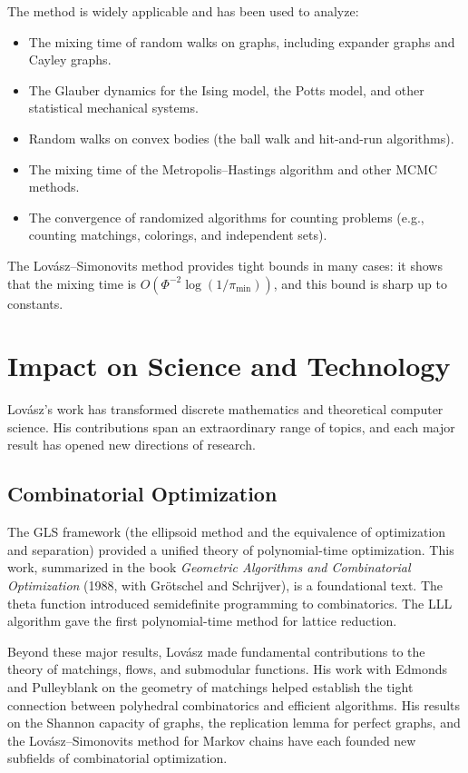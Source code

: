 The method is widely applicable and has been used to analyze:
\begin{itemize}
  \item The mixing time of random walks on graphs, including expander graphs and Cayley graphs.
  \item The Glauber dynamics for the Ising model, the Potts model, and other statistical mechanical systems.
  \item Random walks on convex bodies (the ball walk and hit-and-run algorithms).
  \item The mixing time of the Metropolis--Hastings algorithm and other MCMC methods.
  \item The convergence of randomized algorithms for counting problems (e.g., counting matchings, colorings, and independent sets).
\end{itemize}

The Lov\'{a}sz--Simonovits method provides tight bounds in many cases: it shows that the mixing time is \(O(\Phi^{-2} \log(1/\pi_{\min}))\), and this bound is sharp up to constants.

\section{Impact on Science and Technology}

Lov\'{a}sz's work has transformed discrete mathematics and theoretical computer science. His contributions span an extraordinary range of topics, and each major result has opened new directions of research.

\subsection{Combinatorial Optimization}
The GLS framework (the ellipsoid method and the equivalence of optimization and separation) provided a unified theory of polynomial-time optimization. This work, summarized in the book \textit{Geometric Algorithms and Combinatorial Optimization} (1988, with Gr\"{o}tschel and Schrijver), is a foundational text. The theta function introduced semidefinite programming to combinatorics. The LLL algorithm gave the first polynomial-time method for lattice reduction.

Beyond these major results, Lov\'{a}sz made fundamental contributions to the theory of matchings, flows, and submodular functions. His work with Edmonds and Pulleyblank on the geometry of matchings helped establish the tight connection between polyhedral combinatorics and efficient algorithms. His results on the Shannon capacity of graphs, the replication lemma for perfect graphs, and the Lov\'{a}sz--Simonovits method for Markov chains have each founded new subfields of combinatorial optimization.

